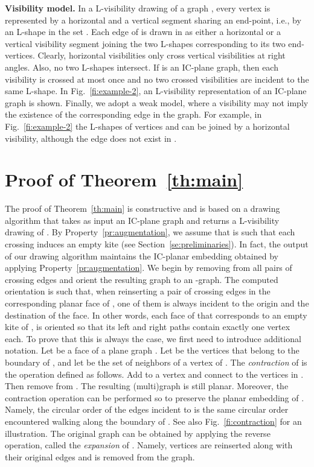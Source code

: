 \documentclass[a4paper]{article}
\newcommand{\shapes}{\xspace}
\begin{document}
{\bf Visibility model.}  In a L-visibility drawing  of a graph , every vertex is represented by a horizontal and a vertical segment sharing an end-point, i.e., by an L-shape in the set \shapes. Each edge of  is drawn in  as either a horizontal or a vertical visibility segment joining the two L-shapes corresponding to its two end-vertices. Clearly, horizontal visibilities only cross vertical visibilities at right angles. Also, no two L-shapes intersect. If  is an IC-plane graph, then each visibility is crossed at most once and no two crossed visibilities are incident to the same L-shape. In Fig.~\ref{fi:example-2}, an L-visibility representation  of an IC-plane graph  is shown.  Finally, we adopt a weak model, where a visibility may not imply the existence of the corresponding edge in the graph. For example, in Fig.~\ref{fi:example-2} the L-shapes of vertices  and  can be joined by a horizontal visibility, although the edge  does not exist in .



\section{Proof of Theorem~\ref{th:main}}\label{se:proof}

The proof of Theorem~\ref{th:main} is constructive and is based on a drawing algorithm that takes as input an IC-plane graph  and returns a L-visibility drawing  of . By Property~\ref{pr:augmentation}, we assume that  is such that each crossing induces an empty kite (see Section~\ref{se:preliminaries}). In fact, the output of our drawing algorithm maintains the IC-planar embedding obtained by applying Property~\ref{pr:augmentation}. We begin by removing from  all pairs of crossing edges and orient the resulting graph  to an -graph. The computed orientation is such that, when reinserting a pair of crossing edges in the corresponding planar face of , one of them is always incident to the origin and the destination of the face. In other words, each face of  that corresponds to an empty kite of , is oriented so that its left and right paths contain exactly one vertex each. To prove that this is always the case, we first need to introduce additional notation. Let  be a face of a plane graph .  Let  be the  vertices that belong to the boundary of , and let  be the set of neighbors of a vertex  of . The \emph{contraction} of  is the  operation defined as follows. Add to  a vertex  and connect  to the vertices in . Then remove  from . The resulting (multi)graph is still planar. Moreover, the contraction operation can be performed so to preserve the planar embedding of . Namely, the circular order of the edges incident to  is the same circular order encountered walking along the boundary of . See also Fig.~\ref{fi:contraction} for an illustration. The original graph  can be obtained by applying the reverse operation, called the \emph{expansion} of . Namely, vertices  are reinserted along with their original edges and  is removed from the graph. 
\end{document}
